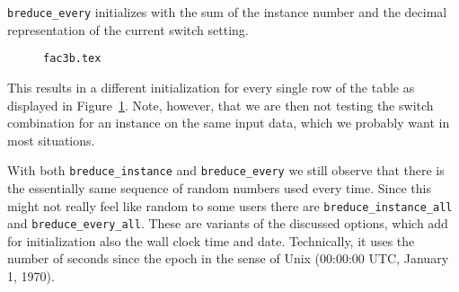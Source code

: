 \documentclass[a4paper]{article}
\begin{document}
\texttt{breduce\_every} initializes with the sum of the instance
number and the decimal representation of the current switch setting.
\begin{figure}[p]
  \begin{center}
    \caption{\texttt{fac3b.tex}\label{FI:fac3b}}
  \end{center}
\end{figure}
This results in a different initialization for every single row of the
table as displayed in Figure~\ref{FI:fac3b}. Note, however, that we
are then not testing the switch combination for an instance on the
same input data, which we probably want in most situations.

With both \texttt{breduce\_instance} and \texttt{breduce\_every} we
still observe that there is the essentially same sequence of random
numbers used every time. Since this might not really feel like random
to some users there are \texttt{breduce\_instance\_all} and
\texttt{breduce\_every\_all}. These are variants of the discussed
options, which add for initialization also the wall clock time and
date. Technically, it uses the number of seconds since the epoch in
the sense of Unix (00:00:00 UTC, January 1, 1970).
\end{document}
